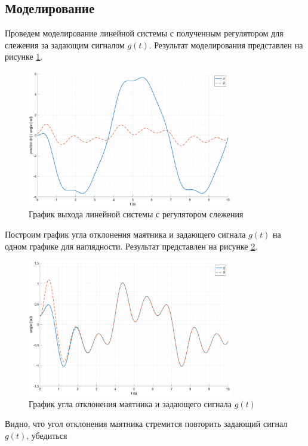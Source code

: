 \subsection{Моделирование}
Проведем моделирование линейной системы с полученным регулятором для слежения за задающим сигналом $g(t)$.
Результат моделирования представлен на рисунке \ref{fig:tracking_lin}.
\begin{figure}[ht!]
    \centering
    \includegraphics[width=0.8\textwidth]{media/plots/follow/linear_out_1.png}
    \caption{График выхода линейной системы с регулятором слежения}
    \label{fig:tracking_lin}
\end{figure}
Построим график угла отклонения маятника и задающего сигнала $g(t)$ на одном графике для наглядности.
Результат представлен на рисунке \ref{fig:tracking_lin_cmp}.
\begin{figure}[ht!]
    \centering
    \includegraphics[width=0.8\textwidth]{media/plots/follow/linear_cmp1.png}
    \caption{График угла отклонения маятника и задающего сигнала $g(t)$}
    \label{fig:tracking_lin_cmp}
\end{figure}
Видно, что угол отклонения маятника стремится повторить задающий сигнал $g(t)$, убедиться 
